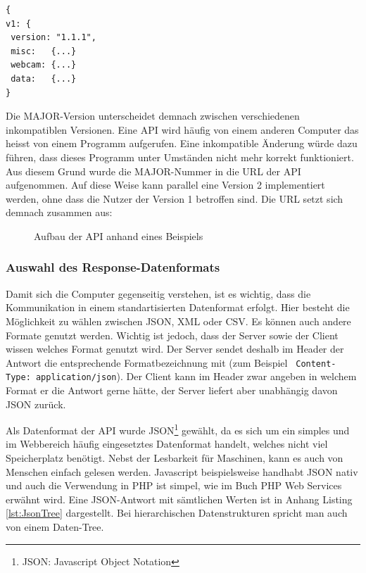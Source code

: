 \vspace{13mm}
\begin{lstlisting}[label=lst:versionierung,caption=Versionierungsangabe auf der obersten Hierarchiestufe, language=HTML5, style=php]
{
v1: {
 version: "1.1.1",
 misc:   {...}
 webcam: {...}
 data:   {...}
}
\end{lstlisting}
\vspace{3mm}

\noindent
Die MAJOR-Version unterscheidet demnach zwischen verschiedenen inkompatiblen Versionen. Eine API wird häufig von einem anderen Computer das heisst von einem Programm aufgerufen. Eine inkompatible Änderung würde dazu führen, dass dieses Programm unter Umständen nicht mehr korrekt funktioniert. Aus diesem Grund wurde die MAJOR-Nummer in die URL der API aufgenommen. Auf diese Weise kann parallel eine Version 2 implementiert werden, ohne dass die Nutzer der Version 1 betroffen sind. Die URL setzt sich demnach zusammen aus:

\begin{figure}[htbp!]
	\centering
	\caption{Aufbau der API anhand eines Beispiels}
	\label{img:apiformat}
\end{figure}


\subsubsection{Auswahl des Response-Datenformats}
Damit sich die Computer gegenseitig verstehen, ist es wichtig, dass die Kommunikation in einem standartisierten Datenformat erfolgt. Hier besteht die Möglichkeit zu wählen zwischen JSON, XML oder CSV. Es können auch andere Formate genutzt werden. Wichtig ist jedoch, dass der Server sowie der Client wissen welches Format genutzt wird. Der Server sendet deshalb im Header der Antwort die entsprechende Formatbezeichnung mit (zum Beispiel \texttt{ Content-Type: application/json}). Der Client kann im Header zwar angeben in welchem Format er die Antwort gerne hätte, der Server liefert aber unabhängig davon JSON zurück.

Als Datenformat der API wurde JSON\footnote{JSON: Javascript Object Notation} gewählt, da es sich um ein simples und im Webbereich häufig eingesetztes Datenformat handelt, welches nicht viel Speicherplatz benötigt. Nebst der Lesbarkeit für Maschinen, kann es auch von Menschen einfach gelesen werden. Javascript beispielsweise handhabt JSON nativ und auch die Verwendung in PHP ist simpel, wie im Buch PHP Web Services \cite{LornaJaneMitchell2013oreilly} erwähnt wird. Eine JSON-Antwort mit sämtlichen Werten ist in Anhang Listing \ref{lst:JsonTree} dargestellt. Bei hierarchischen Datenstrukturen spricht man auch von einem Daten-Tree.

